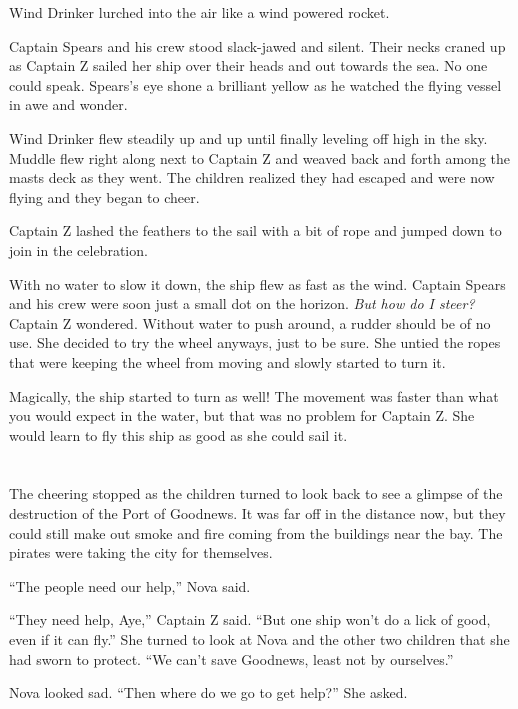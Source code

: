 \documentclass[12pt]{extbook}
\begin{document}
  Wind Drinker lurched into the air like a wind powered rocket.
  
  Captain Spears and his crew stood slack-jawed and silent. Their necks
  craned up as Captain Z sailed her ship over their heads and out towards
  the sea. No one could speak. Spears's eye shone a brilliant yellow as he
  watched the flying vessel in awe and wonder.
  
  Wind Drinker flew steadily up and up until finally leveling off high in
  the sky. Muddle flew right along next to Captain Z and weaved back and
  forth among the masts deck as they went. The children realized they had
  escaped and were now flying and they began to cheer.
  
  Captain Z lashed the feathers to the sail with a bit of rope and jumped
  down to join in the celebration.
  
  With no water to slow it down, the ship flew as fast as the wind.
  Captain Spears and his crew were soon just a small dot on the horizon.
  \emph{But how do I steer?} Captain Z wondered. Without water to push
  around, a rudder should be of no use. She decided to try the wheel
  anyways, just to be sure. She untied the ropes that were keeping the
  wheel from moving and slowly started to turn it.
  
  Magically, the ship started to turn as well! The movement was faster
  than what you would expect in the water, but that was no problem for
  Captain Z. She would learn to fly this ship as good as she could sail
  it.
  
  \section{}\label{section-43}
  
  The cheering stopped as the children turned to look back to see a
  glimpse of the destruction of the Port of Goodnews. It was far off in
  the distance now, but they could still make out smoke and fire coming
  from the buildings near the bay. The pirates were taking the city for
  themselves.
  
  \enquote{The people need our help,} Nova said.
  
  \enquote{They need help, Aye,} Captain Z said. \enquote{But one ship
  won't do a lick of good, even if it can fly.} She turned to look at Nova
  and the other two children that she had sworn to protect. \enquote{We
  can't save Goodnews, least not by ourselves.}
  
  Nova looked sad. \enquote{Then where do we go to get help?} She asked.
  
\end{document}
